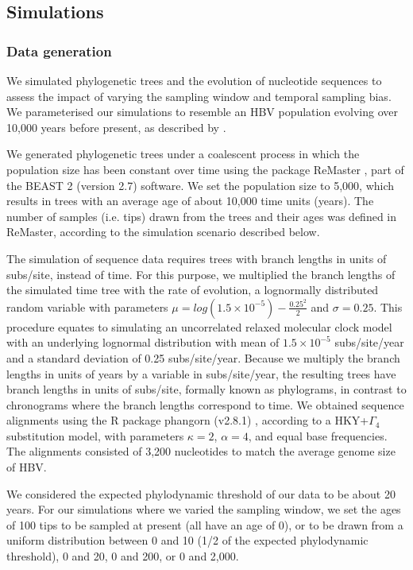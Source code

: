 \documentclass[11pt]{article}
\begin{document}
\subsection{Simulations}
\subsubsection{Data generation}
We simulated phylogenetic trees and the evolution of nucleotide sequences to assess the impact of varying the sampling window and temporal sampling bias. We parameterised our simulations to resemble an HBV population evolving over 10,000 years before present, as described by \cite{kocher2021ten}. 

We generated phylogenetic trees under a coalescent process in which the population size has been constant over time using the package ReMaster \citep{vaughan2024remaster}, part of the BEAST 2 (version 2.7) software. We set the population size to 5,000, which results in trees with an average age of about 10,000 time units (years). The number of samples (i.e. tips) drawn from the trees and their ages was defined in ReMaster, according to the simulation scenario described below.

The simulation of sequence data requires trees with branch lengths in units of subs/site, instead of time. For this purpose, we multiplied the branch lengths of the simulated time tree with the rate of evolution, a lognormally distributed random variable with parameters $\mu=log(1.5\times10^{-5}) - \frac{0.25^2}{2}$ and $\sigma=0.25$. This procedure equates to simulating an uncorrelated relaxed molecular clock model with an underlying lognormal distribution \citep{drummond2006relaxed} with mean of $1.5\times10^{-5}$ subs/site/year and a standard deviation of 0.25 subs/site/year. Because we multiply the branch lengths in units of years by a variable in subs/site/year, the resulting trees have branch lengths in units of subs/site, formally known as phylograms, in contrast to chronograms where the branch lengths correspond to time.   We obtained sequence alignments using the R package phangorn (v2.8.1) \citep{schliep2011phangorn}, according to a HKY+$\Gamma_4$ substitution model, with parameters $\kappa=2$, $\alpha=4$, and equal base frequencies. The alignments consisted of 3,200 nucleotides to match the average genome size of HBV.

We considered the expected phylodynamic threshold of our data to be about 20 years. For our simulations where we varied the sampling window, we set the ages of 100 tips to be sampled at present (all have an age of 0), or to be drawn from a uniform distribution between 0 and 10 (1/2 of the expected phylodynamic threshold), 0 and 20, 0 and 200, or 0 and 2,000. 
\end{document}
